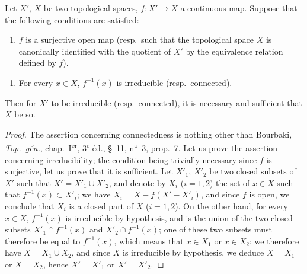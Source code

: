 \begin{lemma}[4.4.2]
\label{IV.4.4.2}
Let $X'$, $X$ be two topological spaces, $f:X'\to X$ a continuous map.
Suppose that the following conditions are satisfied:
\begin{enumerate}[label=(\roman*)]
  \item $f$ is a surjective open map (resp.\ such that the topological space $X$ is canonically identified with the quotient of $X'$ by the equivalence relation defined by $f$).
\end{enumerate}
\end{lemma}

\begin{enumerate}
  \item[\rm(ii)] For every $x\in X$, $f^{-1}(x)$ is irreducible (resp.\ connected).
\end{enumerate}

Then for $X'$ to be irreducible (resp.\ connected), it is necessary and sufficient that $X$ be so.

\begin{proof}
The assertion concerning connectedness is nothing other than Bourbaki, \emph{Top.\ g\'en.}, chap.~I\textsuperscript{er}, 3\textsuperscript{e} \'ed., \S~11, n\textsuperscript{o}~3, prop.~7.
Let us prove the assertion concerning irreducibility; the condition being trivially necessary since $f$ is surjective, let us prove that it is sufficient.
Let $X'_1$, $X'_2$ be two closed subsets of $X'$ such that $X'=X'_1\cup X'_2$, and denote by $X_i$ ($i=1,2$) the set of $x\in X$ such that $f^{-1}(x)\subset X'_i$; we have $X_i=X-f(X'-X'_i)$, and since $f$ is open, we conclude that $X_i$ is a closed part of $X$ ($i=1,2$).
On the other hand, for every $x\in X$, $f^{-1}(x)$ is irreducible by hypothesis, and is the union of the two closed subsets $X'_1\cap f^{-1}(x)$ and $X'_2\cap f^{-1}(x)$; one of these two subsets must therefore be equal to $f^{-1}(x)$, which means that $x\in X_1$ or $x\in X_2$; we therefore have $X=X_1\cup X_2$, and since $X$ is irreducible by hypothesis, we deduce $X=X_1$ or $X=X_2$, hence $X'=X'_1$ or $X'=X'_2$.
\end{proof}

